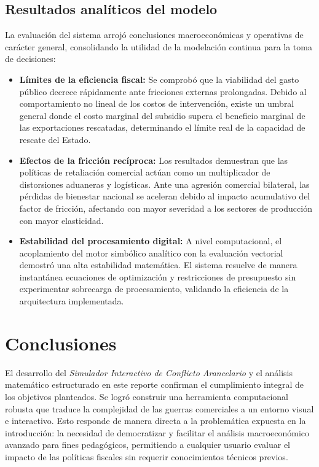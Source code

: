 \documentclass[12pt, a4paper]{article}
\begin{document}
\subsection{Resultados analíticos del modelo}

La evaluación del sistema arrojó conclusiones macroeconómicas y operativas de carácter general, consolidando la utilidad de la modelación continua para la toma de decisiones:

\begin{itemize}
    \item \textbf{Límites de la eficiencia fiscal:} Se comprobó que la viabilidad del gasto público decrece rápidamente ante fricciones externas prolongadas. Debido al comportamiento no lineal de los costos de intervención, existe un umbral general donde el costo marginal del subsidio supera el beneficio marginal de las exportaciones rescatadas, determinando el límite real de la capacidad de rescate del Estado.
    
    \item \textbf{Efectos de la fricción recíproca:} Los resultados demuestran que las políticas de retaliación comercial actúan como un multiplicador de distorsiones aduaneras y logísticas. Ante una agresión comercial bilateral, las pérdidas de bienestar nacional se aceleran debido al impacto acumulativo del factor de fricción, afectando con mayor severidad a los sectores de producción con mayor elasticidad.
    
    \item \textbf{Estabilidad del procesamiento digital:} A nivel computacional, el acoplamiento del motor simbólico analítico con la evaluación vectorial demostró una alta estabilidad matemática. El sistema resuelve de manera instantánea ecuaciones de optimización y restricciones de presupuesto sin experimentar sobrecarga de procesamiento, validando la eficiencia de la arquitectura implementada.
\end{itemize}

\section{Conclusiones}

El desarrollo del \textit{Simulador Interactivo de Conflicto Arancelario} y el análisis matemático estructurado en este reporte confirman el cumplimiento integral de los objetivos planteados. Se logró construir una herramienta computacional robusta que traduce la complejidad de las guerras comerciales a un entorno visual e interactivo. Esto responde de manera directa a la problemática expuesta en la introducción: la necesidad de democratizar y facilitar el análisis macroeconómico avanzado para fines pedagógicos, permitiendo a cualquier usuario evaluar el impacto de las políticas fiscales sin requerir conocimientos técnicos previos.
\end{document}
